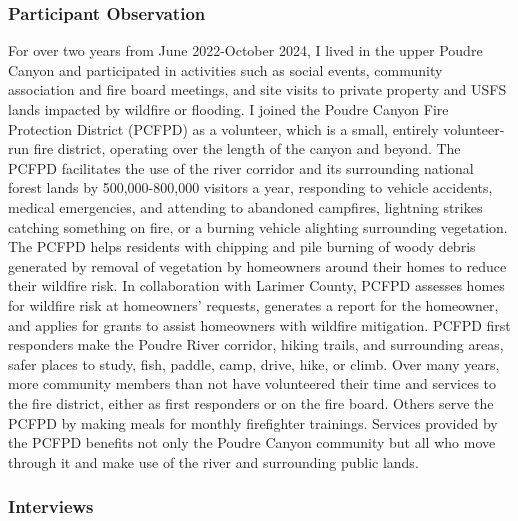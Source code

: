 \documentclass[
]{article}
\begin{document}
\subsubsection{Participant Observation}\label{participant-observation-1}

For over two years from June 2022-October 2024, I lived in the upper Poudre Canyon and participated in activities such as social events, community association and fire board meetings, and site visits to private property and USFS lands impacted by wildfire or flooding. I joined the Poudre Canyon Fire Protection District (PCFPD) as a volunteer, which is a small, entirely volunteer-run fire district, operating over the length of the canyon and beyond. The PCFPD facilitates the use of the river corridor and its surrounding national forest lands by 500,000-800,000 visitors a year, responding to vehicle accidents, medical emergencies, and attending to abandoned campfires, lightning strikes catching something on fire, or a burning vehicle alighting surrounding vegetation. The PCFPD helps residents with chipping and pile burning of woody debris generated by removal of vegetation by homeowners around their homes to reduce their wildfire risk. In collaboration with Larimer County, PCFPD assesses homes for wildfire risk at homeowners' requests, generates a report for the homeowner, and applies for grants to assist homeowners with wildfire mitigation. PCFPD first responders make the Poudre River corridor, hiking trails, and surrounding areas, safer places to study, fish, paddle, camp, drive, hike, or climb. Over many years, more community members than not have volunteered their time and services to the fire district, either as first responders or on the fire board. Others serve the PCFPD by making meals for monthly firefighter trainings. Services provided by the PCFPD benefits not only the Poudre Canyon community but all who move through it and make use of the river and surrounding public lands.

\subsubsection{Interviews}\label{interviews-1}
\end{document}
